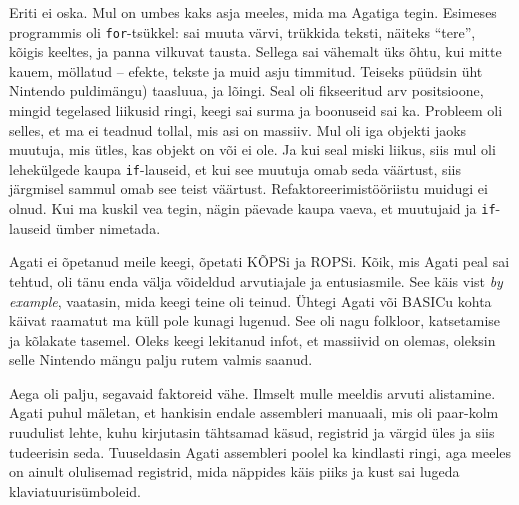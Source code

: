 Eriti ei oska. Mul on umbes kaks asja meeles, mida ma Agatiga tegin. Esimeses 
programmis oli \verb|for|-tsükkel: sai muuta värvi, trükkida 
teksti, näiteks \enquote{tere}, kõigis keeltes, ja panna vilkuvat 
tausta. Sellega sai vähemalt üks õhtu, kui mitte kauem, möllatud --
efekte, tekste ja muid asju timmitud. Teiseks püüdsin 
üht Nintendo puldimängu) taasluua, ja 
lõingi. Seal oli fikseeritud arv positsioone, mingid tegelased 
liikusid ringi, keegi sai surma ja 
boonuseid sai ka. Probleem oli selles, et ma ei teadnud tollal, mis asi 
on massiiv. Mul oli iga objekti jaoks muutuja, 
mis ütles, kas objekt on või ei ole. Ja kui seal miski liikus, siis 
mul oli lehekülgede kaupa \verb|if|-lauseid, et kui see muutuja omab seda 
väärtust, siis järgmisel sammul omab see teist väärtust. 
Refaktoreerimistööriistu muidugi ei olnud. Kui ma kuskil vea tegin, nägin 
päevade kaupa vaeva, et muutujaid ja \verb|if|-lauseid 
ümber nimetada.



Agati ei õpetanud meile keegi, õpetati 
KÕPSi ja ROPSi. Kõik, mis Agati peal sai tehtud, oli tänu enda välja 
võideldud arvutiajale ja entusiasmile. See käis vist \emph{by 
example}, vaatasin, mida keegi teine oli teinud. Ühtegi Agati või BASICu kohta 
käivat raamatut ma küll pole kunagi lugenud. See oli nagu folkloor, 
katsetamise ja kõlakate tasemel. Oleks keegi lekitanud infot, et 
massiivid on olemas, oleksin selle Nintendo mängu palju rutem valmis saanud. 


Aega oli palju, segavaid faktoreid vähe. Ilmselt mulle meeldis
arvuti alistamine. Agati puhul
mäletan, et hankisin endale 
assembleri manuaali, mis oli 
paar-kolm ruudulist lehte, kuhu kirjutasin tähtsamad käsud, registrid 
ja värgid üles ja siis tudeerisin seda. 
Tuuseldasin Agati assembleri poolel ka kindlasti ringi, aga meeles on ainult olulisemad registrid, mida näppides käis piiks 
ja kust sai lugeda klaviatuurisümboleid.

